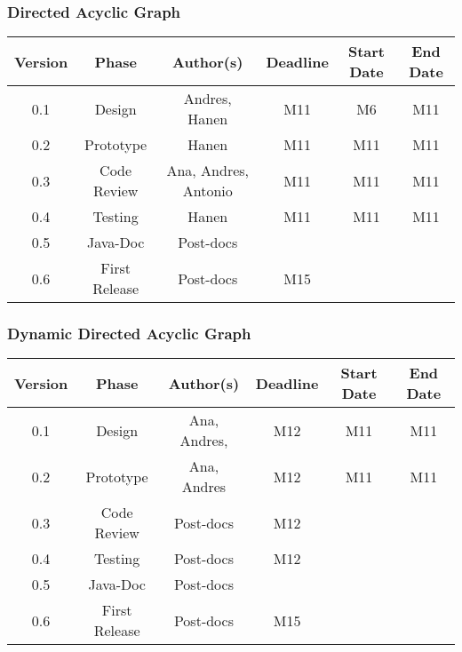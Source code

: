 \subsubsection*{Directed Acyclic Graph}

\begin{table}[H]
\begin{tabular}{cccccc}
\hline
\textbf{Version} & \textbf{Phase} & \textbf{Author(s)} & \textbf{Deadline} & \textbf{Start Date} & \textbf{End Date}\\
\hline
0.1 & Design & Andres, Hanen & M11  & M6 & M11\\
\hline 
0.2 & Prototype & Hanen & M11 & M11 & M11\\
\hline 
0.3 & Code Review & Ana, Andres, Antonio & M11 & M11 & M11\\
\hline 
0.4 & Testing & Hanen & M11 & M11 & M11\\
\hline 
0.5 & Java-Doc  & Post-docs &  &  & \\
\hline 
0.6 & First Release & Post-docs & M15 &  & \\
\hline
\end{tabular}
\end{table}

\subsubsection*{Dynamic Directed Acyclic Graph}

\begin{table}[H]
\begin{tabular}{cccccc}
\hline
\textbf{Version} & \textbf{Phase} & \textbf{Author(s)} & \textbf{Deadline} & \textbf{Start Date} & \textbf{End Date}\\
\hline
0.1 & Design & Ana, Andres, &  M12 & M11 & M11\\
\hline 
0.2 & Prototype & Ana, Andres &  M12  & M11 & M11\\
\hline 
0.3 & Code Review &  Post-docs &  M12  &  & \\
\hline 
0.4 & Testing & Post-docs & M12 &  & \\
\hline 
0.5 & Java-Doc  & Post-docs &  &  & \\
\hline 
0.6 & First Release & Post-docs & M15 &  & \\
\hline
\end{tabular}
\end{table}


